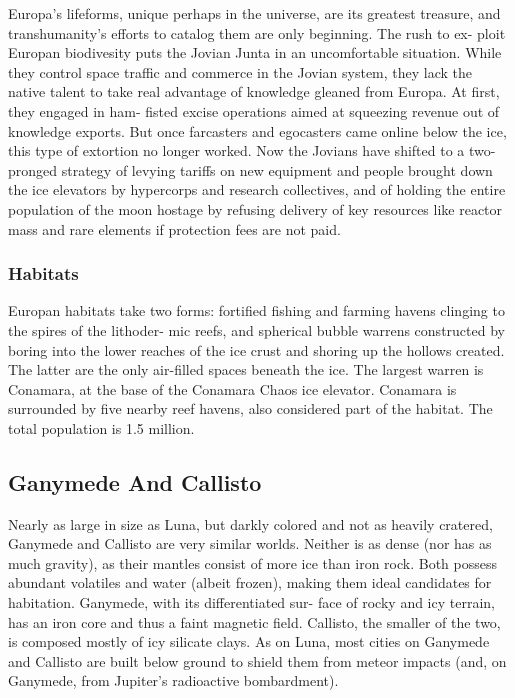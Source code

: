Europa's lifeforms, unique perhaps in the universe, 
are its greatest treasure, and transhumanity's efforts 
to catalog them are only beginning. The rush to ex-
ploit Europan biodivesity puts the Jovian Junta in an 
uncomfortable situation. While they control space 
traffic and commerce in the Jovian system, they lack 
the native talent to take real advantage of knowledge 
gleaned from Europa. At first, they engaged in ham-
fisted excise operations aimed at squeezing revenue 
out of knowledge exports. But once farcasters and 
egocasters came online below the ice, this type of 
extortion no longer worked. Now the Jovians have 
shifted to a two-pronged strategy of levying tariffs 
on new equipment and people brought down the ice 
elevators by hypercorps and research collectives, and 
of holding the entire population of the moon hostage 
by refusing delivery of key resources like reactor mass 
and rare elements if protection fees are not paid.

\subsubsection{Habitats}

Europan habitats take two forms: fortified fishing and 
farming havens clinging to the spires of the lithoder-
mic reefs, and spherical bubble warrens constructed 
by boring into the lower reaches of the ice crust and 
shoring up the hollows created. The latter are the only 
air-filled spaces beneath the ice. The largest warren is 
Conamara, at the base of the Conamara Chaos ice 
elevator. Conamara is surrounded by five nearby reef 
havens, also considered part of the habitat. The total 
population is 1.5 million.

\subsection{Ganymede And Callisto}

Nearly as large in size as Luna, but darkly colored 
and not as heavily cratered, Ganymede and Callisto 
are very similar worlds. Neither is as dense (nor has 
as much gravity), as their mantles consist of more ice 
than iron rock. Both possess abundant volatiles and 
water (albeit frozen), making them ideal candidates 
for habitation. Ganymede, with its differentiated sur-
face of rocky and icy terrain, has an iron core and thus 
a faint magnetic field. Callisto, the smaller of the two, 
is composed mostly of icy silicate clays. As on Luna, 
most cities on Ganymede and Callisto are built below 
ground to shield them from meteor impacts (and, on 
Ganymede, from Jupiter's radioactive bombardment).

